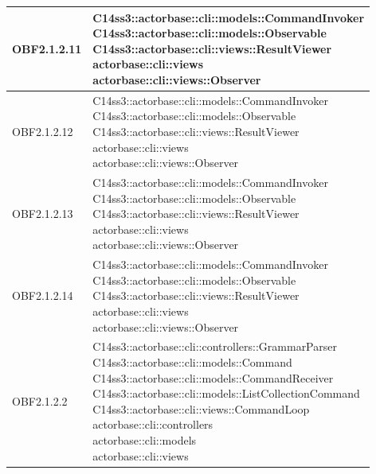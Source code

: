 \documentclass{scalatekids-article}
\begin{document}
\begin{longtable}[H]{|p{4.5cm}|p{13cm}|}
\hline
OBF2.1.2.11 & \multiLineCell[t]{C14ss3::actorbase::cli::models::CommandInvoker\\C14ss3::actorbase::cli::models::Observable\\C14ss3::actorbase::cli::views::ResultViewer\\actorbase::cli::views\\actorbase::cli::views::Observer\\}\\
\hline
OBF2.1.2.12 & \multiLineCell[t]{C14ss3::actorbase::cli::models::CommandInvoker\\C14ss3::actorbase::cli::models::Observable\\C14ss3::actorbase::cli::views::ResultViewer\\actorbase::cli::views\\actorbase::cli::views::Observer\\}\\
\hline
OBF2.1.2.13 & \multiLineCell[t]{C14ss3::actorbase::cli::models::CommandInvoker\\C14ss3::actorbase::cli::models::Observable\\C14ss3::actorbase::cli::views::ResultViewer\\actorbase::cli::views\\actorbase::cli::views::Observer\\}\\
\hline
OBF2.1.2.14 & \multiLineCell[t]{C14ss3::actorbase::cli::models::CommandInvoker\\C14ss3::actorbase::cli::models::Observable\\C14ss3::actorbase::cli::views::ResultViewer\\actorbase::cli::views\\actorbase::cli::views::Observer\\}\\
\hline
OBF2.1.2.2 & \multiLineCell[t]{C14ss3::actorbase::cli::controllers::GrammarParser\\C14ss3::actorbase::cli::models::Command\\C14ss3::actorbase::cli::models::CommandReceiver\\C14ss3::actorbase::cli::models::ListCollectionCommand\\C14ss3::actorbase::cli::views::CommandLoop\\actorbase::cli::controllers\\actorbase::cli::models\\actorbase::cli::views\\}\\

\end{longtable}
\end{document}

